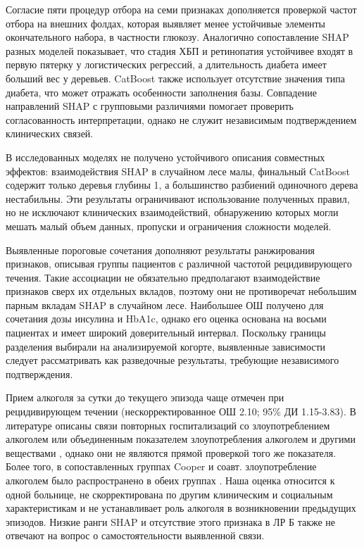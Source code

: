 \documentclass{crm-article}
\begin{document}
Согласие пяти процедур отбора на семи признаках дополняется проверкой частот отбора на внешних фолдах, которая выявляет менее устойчивые элементы окончательного набора, в частности глюкозу. Аналогично сопоставление SHAP разных моделей показывает, что стадия ХБП и ретинопатия устойчивее входят в первую пятерку у логистических регрессий, а длительность диабета имеет больший вес у деревьев. CatBoost также использует отсутствие значения типа диабета, что может отражать особенности заполнения базы. Совпадение направлений SHAP с групповыми различиями помогает проверить согласованность интерпретации, однако не служит независимым подтверждением клинических связей.

В исследованных моделях не получено устойчивого описания совместных эффектов: взаимодействия SHAP в случайном лесе малы, финальный CatBoost содержит только деревья глубины 1, а большинство разбиений одиночного дерева нестабильны. Эти результаты ограничивают использование полученных правил, но не исключают клинических взаимодействий, обнаружению которых могли мешать малый объем данных, пропуски и ограничения сложности моделей.

Выявленные пороговые сочетания дополняют результаты ранжирования признаков, описывая группы пациентов с различной частотой рецидивирующего течения. Такие ассоциации не обязательно предполагают взаимодействие признаков сверх их отдельных вкладов, поэтому они не противоречат небольшим парным вкладам SHAP в случайном лесе. Наибольшее ОШ получено для сочетания дозы инсулина и HbA1c, однако его оценка основана на восьми пациентах и имеет широкий доверительный интервал. Поскольку границы разделения выбирали на анализируемой когорте, выявленные зависимости следует рассматривать как разведочные результаты, требующие независимого подтверждения.

Прием алкоголя за сутки до текущего эпизода чаще отмечен при рецидивирующем течении (нескорректированное ОШ 2.10; 95\% ДИ 1.15-3.83). В литературе описаны связи повторных госпитализаций со злоупотреблением алкоголем \cite{ref7} или объединенным показателем злоупотребления алкоголем и другими веществами \cite{ref15}, однако они не являются прямой проверкой того же показателя. Более того, в сопоставленных группах Cooper и соавт. злоупотребление алкоголем было распространено в обеих группах \cite{ref8}. Наша оценка относится к одной больнице, не скорректирована по другим клиническим и социальным характеристикам и не устанавливает роль алкоголя в возникновении предыдущих эпизодов. Низкие ранги SHAP и отсутствие этого признака в ЛР Б также не отвечают на вопрос о самостоятельности выявленной связи.
\end{document}
